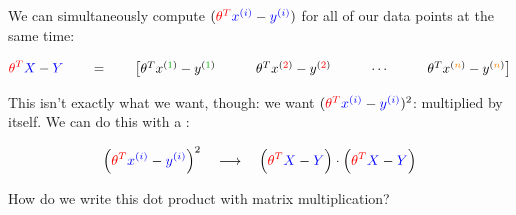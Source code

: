         We can simultaneously compute $(\textcolor{red}{\theta^T} \textcolor{blue}{x^{(i)}}  - \textcolor{blue}{y^{(i)}})$ for all of our data points at the same time:

        \begin{equation*}
            \red{\theta^T} \blu{X} - \blu{Y}  \qquad=\qquad 
            \begin{bmatrix}
                \theta^T \ex{x}{\grn{1}}  - \ex{y}{\grn{1}} &&&
                \theta^T \ex{x}{\red{2}}  - \ex{y}{\red{2}} &&&
                \cdots &&&
                \theta^T \ex{x}{\org{n}}  -  \ex{y}{\org{n}}
            \end{bmatrix}
        \end{equation*}

        This isn't exactly what we want, though: we want $(\textcolor{red}{\theta^T} \textcolor{blue}{x^{(i)}}  - \textcolor{blue}{y^{(i)}})^2$: multiplied by itself. We can do this with a :

        \begin{equation}
            \Big( \textcolor{red}{\theta^T} \textcolor{blue}{x^{(i)}}  - \textcolor{blue}{y^{(i)}} \Big)^2 
            \quad \longrightarrow \quad
            \Big( \textcolor{red}{\theta^T} \textcolor{blue}{X} - \textcolor{blue}{Y} \Big) \cdot 
            \Big( \textcolor{red}{\theta^T} \textcolor{blue}{X} - \textcolor{blue}{Y} \Big)
        \end{equation}

        How do we write this dot product with matrix multiplication?\\

